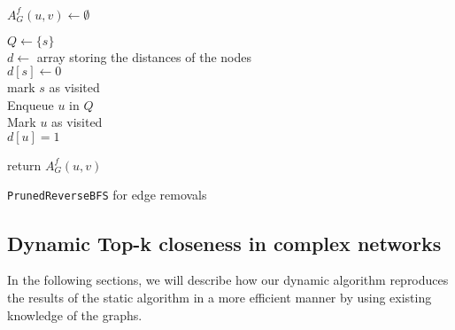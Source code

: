 \begin{algorithm2e}[h!]
 \label{alg:prunedReverseBFSRemovals}
   $A_G^f(u, v) \gets \emptyset$
   
   $Q \gets \{s\}$ \\
   $d \gets $ array storing the distances of the nodes \\
   $d[s] \gets 0$ \\
   mark $s$ as visited \\
   
   Enqueue $u$ in $Q$ \label{alg:addingAdditionalNeighbor} \\
   Mark $u$ as visited \\
   $d[u] = 1$ \label{alg:addingAdditionalNeighborEnd} \\
   
   
   return $A_G^f(u, v)$ 
   
 \caption{\texttt{PrunedReverseBFS} for edge removals}
\end{algorithm2e}



\subsection{Dynamic Top-k closeness in complex networks}
\label{sec:dynamicTopKOptimizations}
In the following sections, we will describe how our dynamic algorithm reproduces the results of the static algorithm in a more efficient manner by using existing knowledge of the graphs.

